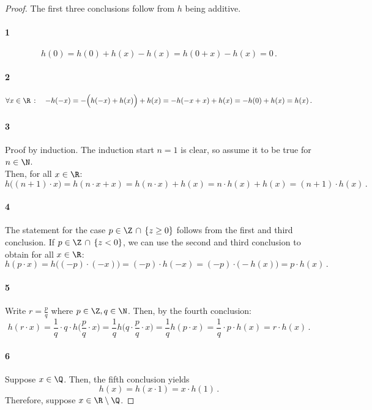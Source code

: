 \begin{proof}
The first three conclusions follow from $h$ being additive. 

\paragraph{1} 
\[ h(0) = h(0) + h(x) - h(x) = h(0 + x) - h(x) = 0 \, .\]

\paragraph{2} 
\[ \forall x \in \R \, : \quad -h(-x) = - \Big( h(-x) + h(x) \Big) + h(x) = - h( -x + x ) + h(x) = - h(0) + h(x) = h(x) \, . \]

\paragraph{3} 
Proof by induction. The induction start $n=1$ is clear, so assume it to be true for $n \in \N$. 
\\
Then, for all $x \in \R$:
\[ h\Big( (n+1) \cdot x \Big) = h(n\cdot x + x) = h(n \cdot x) + h(x) = n \cdot h(x) + h(x) = (n+1)\cdot h(x) \, . \]

\paragraph{4} 
The statement for the case $p \in \Z \, \cap \, \{ z \geq 0 \}$ follows from the first and third conclusion. If $p \in  \Z \, \cap \, \{ z < 0 \}$, we can use the second and third conclusion to obtain for all $x \in \R$:
\[h(p \cdot x) = h\Big( (-p) \cdot (-x) \Big) = (-p) \cdot h(-x) = (-p) \cdot \Big( -h(x) \Big) = p \cdot h(x) \, .\]

\paragraph{5} 
Write $r = \frac{p}{q}$ where $p \in \Z, q \in \N$. Then, by the fourth conclusion:
\[ h(r \cdot x) = \frac{1}{q} \cdot q \cdot h\Big( \frac{p}{q} \cdot x \big) = \frac{1}{q} h\Big( q \cdot \frac{p}{q} \cdot x \big) = \frac{1}{q} h(p \cdot x ) =\frac{1}{q} \cdot p \cdot h(x) = r \cdot h(x) \, . \]

\paragraph{6} 
Suppose $x \in \Q$. Then, the fifth conclusion yields
\[ h(x) = h(x \cdot 1) = x \cdot h(1) \, .\]
Therefore, suppose $x \in \R \setminus \Q$.


\end{proof}
